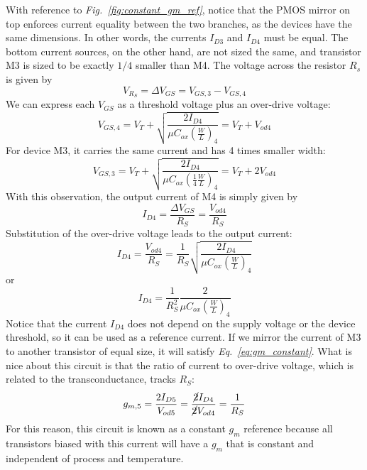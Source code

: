 With reference to \emph{Fig.~\ref{fig:constant_gm_ref}}, notice that the PMOS mirror on top enforces current equality between the two branches, as the devices have the same dimensions.  In other words, the currents $I_{D3}$ and $I_{D4}$ must be equal.  The bottom current sources, on the other hand, are not sized the same, and transistor M3 is sized to be exactly $1/4$ smaller than M4.  The voltage across the resistor $R_s$ is given by
    \begin{equation}
        V_{R_S} = \Delta V_{GS} = V_{GS,3} - V_{GS,4}
    \end{equation}
We can express each $V_{GS}$ as a threshold voltage plus an over-drive voltage:
    \begin{equation}
        V_{GS,4} = V_T + \sqrt{\frac{2 I_{D4}}{\mu C_{ox} \left( \frac{W}{L} \right)_4}} = V_T + V_{od4}
    \end{equation}
For device M3, it carries the same current and has 4 times smaller width:
    \begin{equation}
        V_{GS,3} = V_T + \sqrt{\frac{2 I_{D4}}{\mu C_{ox} \left( \frac{1}{4} \frac{W}{L} \right)_4}} = V_T + 2V_{od4}
    \end{equation}
With this observation, the output current of M4 is simply given by
    \begin{equation}
        I_{D4} = \frac{\Delta V_{GS}}{R_S} = \frac{V_{od4}}{R_S}  \label{eq:gm_constant}
    \end{equation}
Substitution of the over-drive voltage leads to the output current:
    \begin{equation}
        I_{D4} = \frac{V_{od4}}{R_S} = \frac{1}{R_S} \sqrt{\frac{2 I_{D4}}{\mu C_{ox} \left( \frac{W}{L} \right)_4}}
    \end{equation}
or
    \begin{equation}
        I_{D4} = \frac{1}{R_S^2} \frac{2}{\mu C_{ox} \left( \frac{W}{L} \right)_4}
    \end{equation}	
Notice that the current $I_{D4}$ does not depend on the supply voltage or the device threshold, so it can be used as a reference current.  If we mirror the current of M3 to another transistor of equal size, it will satisfy \emph{Eq.~\ref{eq:gm_constant}}.  What is nice about this circuit is that the ratio of current to over-drive voltage, which is related to the transconductance, tracks $R_S$:
    \begin{equation}
        g_{m,5} = \frac{2 I_{D5}}{V_{od5}} = \frac{\cancel{2} I_{D4}}{\cancel{2} V_{od4}} = \frac{1}{R_S} 
    \end{equation}
For this reason, this circuit is known as a constant $g_m$ reference because all transistors biased with this current will have a $g_m$ that is constant and independent of process and temperature.
